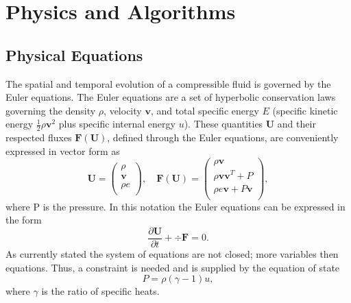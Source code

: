 \section{Physics and Algorithms}
\subsection{Physical Equations}
\label{sec.physical.eq}
The spatial and temporal evolution of a compressible fluid is governed by the
Euler equations. The Euler equations are a set of hyperbolic conservation laws
governing the density $\rho$, velocity $\mathbf{v}$, and total specific energy
$E$ (specific kinetic energy $\frac{1}{2}\rho \mathbf{v}^2$ plus specific internal
energy $u$). These quantities $\mathbf{U}$ and their respected fluxes
$\mathbf{F}(\mathbf{U})$, defined through the Euler equations, are conveniently
expressed in vector form as
%
\begin{equation}
    \mathbf{U} =
    \left(
    \begin{array}{c}
        \rho \\
        \mathbf{v} \\
        \rho e \\
    \end{array} \right),
    \quad
    \mathbf{F}(\mathbf{U}) =
    \left(
    \begin{array}{c}
        \rho\mathbf{v} \\
        \rho\mathbf{v}\mathbf{v}^T + P \\
        \rho e\mathbf{v} + P\mathbf{v} \\
    \end{array}
    \right),
\end{equation}
%
where P is the pressure. In this notation the Euler equations can be expressed
in the form
%
\begin{equation}
    \label{eq.euler}
    \frac{\partial \mathbf{U}}{\partial t} + \div \mathbf{F} = 0.
\end{equation}
%
As currently stated the system of equations are not closed; more variables then
equations. Thus, a constraint is needed and is supplied by the equation of state
%
\begin{equation}
    P = \rho(\gamma - 1)u,
\end{equation}
%
where $\gamma$ is the ratio of specific heats.

